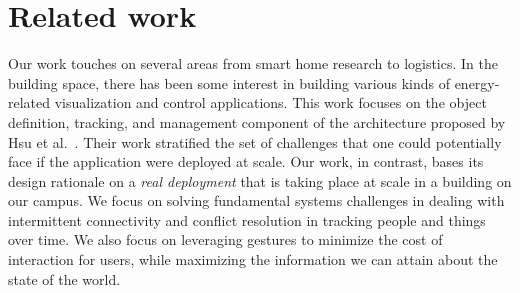 \section{Related work}

Our work touches on several areas from smart home research to logistics.  In the building space, there has been
some interest in building various kinds of energy-related visualization and control applications.
This work focuses on the object definition, tracking, and management component of the architecture proposed by 
Hsu et al.~\cite{hbci}.  Their work stratified the set of challenges that one could potentially face if the application 
were deployed at scale.  Our
work, in contrast, bases its design rationale on a \emph{real deployment} that is taking place at scale in a building 
on our campus.  We focus on solving fundamental systems challenges in dealing with intermittent connectivity
and conflict resolution in tracking people and things over time.  We also focus on leveraging gestures to minimize
the cost of interaction for users, while maximizing the information we can attain about the state of the world.

